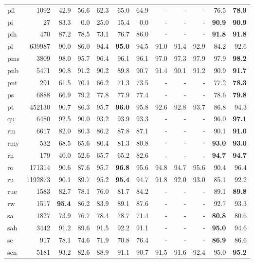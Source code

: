 \documentclass[11pt,a4paper]{article}
\begin{document}
\begin{supertabular}{lrrr|rrr|rrr|rr}
pfl & 1092 & 42.9 & 56.6 & 62.3 & 65.0 & 64.9 & - & - & - & 76.5 & \textbf{78.9}\\
pi & 27 & 83.3 & 0.0 & 25.0 & 15.4 & 0.0 & - & - & - & \textbf{90.9} & \textbf{90.9}\\
pih & 470 & 87.2 & 78.5 & 73.1 & 76.7 & 86.0 & - & - & - & \textbf{91.8} & \textbf{91.8}\\
pl & 639987 & 90.0 & 86.0 & 94.4 & \textbf{95.0} & 94.5 & 91.0 & 91.4 & 92.9 & 84.2 & 92.6\\
pms & 3809 & 98.0 & 95.7 & 96.4 & 96.1 & 96.1 & 97.0 & 97.3 & 97.9 & 97.9 & \textbf{98.2}\\
pnb & 5471 & 90.8 & 91.2 & 90.2 & 89.8 & 90.7 & 91.4 & 90.1 & 91.2 & 90.9 & \textbf{91.7}\\
pnt & 291 & 61.5 & 70.1 & 66.2 & 71.3 & 73.5 & - & - & - & 77.2 & \textbf{78.3}\\
ps & 6888 & 66.9 & 79.2 & 77.8 & 77.9 & 77.4 & - & - & - & 78.6 & \textbf{79.8}\\
pt & 452130 & 90.7 & 86.3 & 95.7 & \textbf{96.0} & 95.8 & 92.6 & 92.8 & 93.7 & 86.8 & 94.3\\
qu & 6480 & 92.5 & 90.0 & 93.2 & 93.9 & 93.3 & - & - & - & 96.0 & \textbf{97.1}\\
rm & 6617 & 82.0 & 80.3 & 86.2 & 87.8 & 87.1 & - & - & - & 90.1 & \textbf{91.0}\\
rmy & 532 & 68.5 & 65.6 & 80.4 & 81.3 & 80.8 & - & - & - & \textbf{93.0} & \textbf{93.0}\\
rn & 179 & 40.0 & 52.6 & 65.7 & 65.2 & 82.6 & - & - & - & \textbf{94.7} & \textbf{94.7}\\
ro & 171314 & 90.6 & 87.6 & 95.7 & \textbf{96.8} & 95.6 & 94.8 & 94.7 & 95.6 & 90.4 & 96.4\\
ru & 1192873 & 90.1 & 89.7 & 95.2 & \textbf{95.4} & 94.7 & 91.8 & 92.0 & 93.0 & 85.1 & 92.2\\
rue & 1583 & 82.7 & 78.1 & 76.0 & 81.7 & 84.2 & - & - & - & 89.1 & \textbf{89.8}\\
rw & 1517 & \textbf{95.4} & 86.2 & 83.9 & 89.1 & 87.6 & - & - & - & 92.7 & 93.3\\
sa & 1827 & 73.9 & 76.7 & 78.4 & 78.7 & 71.4 & - & - & - & \textbf{80.8} & 80.6\\
sah & 3442 & 91.2 & 89.6 & 91.5 & 92.2 & 91.1 & - & - & - & \textbf{95.0} & 94.6\\
sc & 917 & 78.1 & 74.6 & 71.9 & 70.8 & 76.4 & - & - & - & \textbf{86.9} & 86.6\\
scn & 5181 & 93.2 & 82.6 & 88.9 & 91.1 & 90.7 & 91.5 & 91.6 & 92.4 & 95.0 & \textbf{95.2}\\

\end{supertabular}
\end{document}
